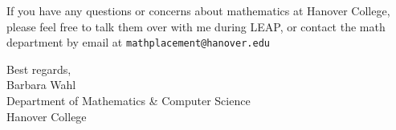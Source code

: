 \documentclass[12pt]{article}
\begin{document}
		If you have any questions or concerns about mathematics at Hanover College, please feel free to talk them over with me during LEAP, or contact the math department by email at \texttt{mathplacement@hanover.edu}
		\vspace{0.5in}

		\noindent Best regards,\\
		Barbara Wahl\\
		Department of Mathematics \& Computer Science\\
		Hanover College
\end{document}
